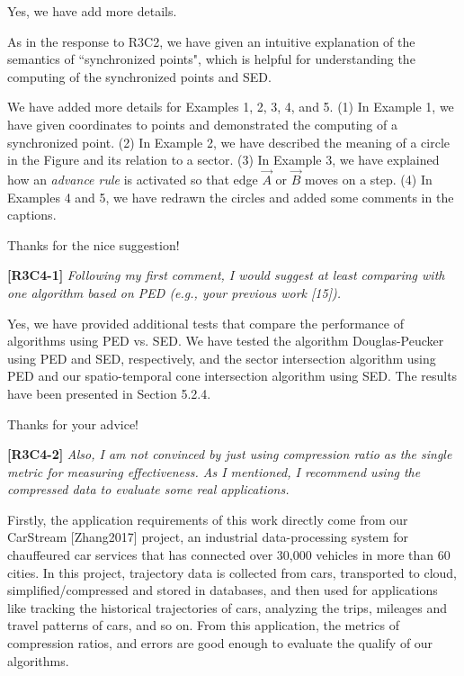 \documentclass{letter}
\begin{document}
Yes, we have add more details.

As in the response to R3C2, we have given an intuitive explanation of the semantics of ``synchronized points", which is helpful for understanding the computing of the synchronized points and SED.

We have added more details for Examples 1, 2, 3, 4, and 5. (1) In Example 1, we have given coordinates to points and demonstrated the computing of a synchronized point. (2) In Example 2, we have described the meaning of a circle in the Figure and its relation to a sector. (3) In Example 3, we have explained how an \emph{advance rule} is activated  so that edge $\overrightarrow{A}$ or $\overrightarrow{B}$ moves on a step. (4) In Examples 4 and 5, we have redrawn the circles and added some comments in the captions.

Thanks for the nice suggestion!

\textbf{[R3C4-1]} \emph{Following my first comment, I would suggest at least comparing with one algorithm based on PED (e.g., your previous work [15]). }

Yes, we have provided additional tests that compare the performance of algorithms using PED vs. SED. We have tested the algorithm Douglas-Peucker using PED and SED, respectively, and the sector intersection algorithm using PED and our spatio-temporal cone intersection algorithm using SED. %
The results have been presented in Section 5.2.4.

Thanks for your advice!


\textbf{[R3C4-2]} \emph{Also, I am not convinced by just using compression ratio as the single metric for measuring effectiveness. As I mentioned, I recommend using the compressed data to evaluate some real applications.}

Firstly, the application requirements of this work directly come from our CarStream [Zhang2017] project, an industrial data-processing system for chauffeured car services that has connected over 30,000 vehicles in more than 60 cities. In this project, trajectory data is collected from cars, transported to cloud, simplified/compressed and stored in databases, and then used for applications like tracking the historical trajectories of cars, analyzing the trips, mileages and travel patterns of cars, and so on.  From this application, the metrics of compression ratios, and errors are good enough to evaluate the qualify of our algorithms.
\end{document}

